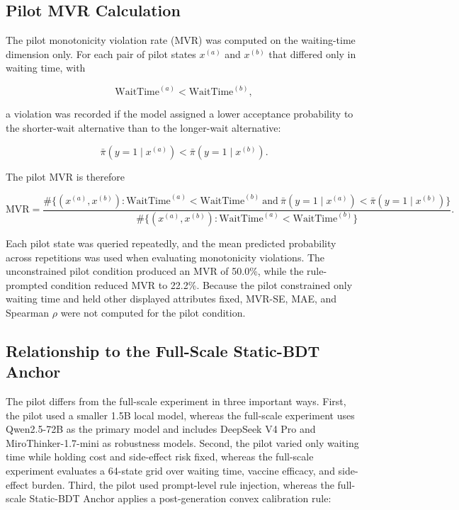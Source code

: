 \documentclass[11pt]{article}
\begin{document}
\subsection{Pilot MVR Calculation}

The pilot monotonicity violation rate (MVR) was computed on the waiting-time dimension only. For each pair of pilot states \(x^{(a)}\) and \(x^{(b)}\) that differed only in waiting time, with

\[
\text{WaitTime}^{(a)} < \text{WaitTime}^{(b)},
\]

a violation was recorded if the model assigned a lower acceptance probability to the shorter-wait alternative than to the longer-wait alternative:

\[
\bar{\pi}(y=1 \mid x^{(a)})
<
\bar{\pi}(y=1 \mid x^{(b)}).
\]

The pilot MVR is therefore

\[
\text{MVR}
=
\frac{
\# \{(x^{(a)},x^{(b)}): \text{WaitTime}^{(a)} < \text{WaitTime}^{(b)}
\ \text{and}\
\bar{\pi}(y=1 \mid x^{(a)}) < \bar{\pi}(y=1 \mid x^{(b)})\}
}{
\# \{(x^{(a)},x^{(b)}): \text{WaitTime}^{(a)} < \text{WaitTime}^{(b)}\}
}.
\]

Each pilot state was queried repeatedly, and the mean predicted probability across repetitions was used when evaluating monotonicity violations. The unconstrained pilot condition produced an MVR of 50.0\%, while the rule-prompted condition reduced MVR to 22.2\%. Because the pilot constrained only waiting time and held other displayed attributes fixed, MVR-SE, MAE, and Spearman \(\rho\) were not computed for the pilot condition.

\subsection{Relationship to the Full-Scale Static-BDT Anchor}

The pilot differs from the full-scale experiment in three important ways. First, the pilot used a smaller 1.5B local model, whereas the full-scale experiment uses Qwen2.5-72B as the primary model and includes DeepSeek V4 Pro and MiroThinker-1.7-mini as robustness models. Second, the pilot varied only waiting time while holding cost and side-effect risk fixed, whereas the full-scale experiment evaluates a 64-state grid over waiting time, vaccine efficacy, and side-effect burden. Third, the pilot used prompt-level rule injection, whereas the full-scale Static-BDT Anchor applies a post-generation convex calibration rule:
\end{document}
